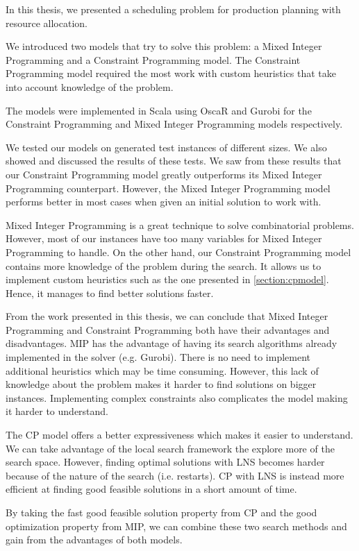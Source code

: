 \documentclass[../thesis.tex]{subfiles}
\begin{document}
In this thesis, we presented a scheduling problem for production planning 
with resource allocation.

We introduced two models that try to solve
this problem: a Mixed Integer Programming and a Constraint Programming model.
The Constraint Programming model required the most work with custom heuristics that take into account knowledge of the problem.

The models were implemented in Scala using OscaR and Gurobi for the Constraint Programming and Mixed Integer Programming models respectively.

We tested our models on generated test instances of different sizes.
We also showed and discussed the results of these tests. We saw from these results that our Constraint Programming model greatly outperforms
its Mixed Integer Programming counterpart.
However, the Mixed Integer Programming model performs better in most cases when given an initial solution 
to work with.


Mixed Integer Programming is a great technique to solve combinatorial problems. However, most of our 
instances have too many variables for Mixed Integer Programming to handle.
On the other hand,
our Constraint Programming model contains more knowledge of the problem during the search. 
It allows us to implement custom heuristics such as the one presented in \autoref{section:cpmodel}. Hence, it manages to find 
better solutions faster. 

From the work presented in this thesis, we can conclude that Mixed Integer Programming and Constraint Programming both have their advantages and disadvantages.
MIP has the advantage of having its search algorithms already implemented in the solver (e.g. Gurobi). There is no need 
to implement additional heuristics which may be time consuming. However, this lack of knowledge about the problem makes 
it harder to find solutions on bigger instances. Implementing complex constraints also complicates the model making it harder to understand. 

The CP model offers a better expressiveness which makes it easier to understand. We can take advantage of the local search 
framework the explore more of the search space. However, finding optimal solutions with LNS becomes harder because of 
the nature of the search (i.e. restarts). CP with LNS is instead more efficient at finding good feasible solutions in a 
short amount of time.

By taking the fast good feasible solution property from CP and the good optimization property from MIP, we can combine these two 
search methods and gain from the advantages of both models.
\end{document}
